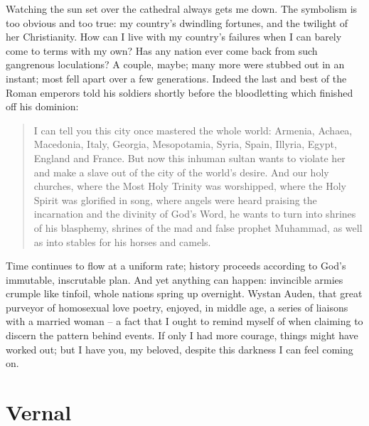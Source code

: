 \documentclass{amsbook}
\begin{document}
Watching the sun set over the cathedral always gets me down. The symbolism is too obvious and too true: my country's dwindling fortunes, and the twilight of her Christianity. How can I live with my country's failures when I can barely come to terms with my own? Has any nation ever come back from such gangrenous loculations? A couple, maybe; many more were stubbed out in an instant; most fell apart over a few generations. Indeed the last and best of the Roman emperors told his soldiers shortly before the bloodletting which finished off his dominion:

\begin{quote}
    I can tell you this city once mastered the whole world: Armenia, Achaea, Macedonia, Italy, Georgia, Mesopotamia, Syria, Spain, Illyria, Egypt, England and France. But now this inhuman sultan wants to violate her and make a slave out of the city of the world's desire. And our holy churches, where the Most Holy Trinity was worshipped, where the Holy Spirit was glorified in song, where angels were heard praising the incarnation and the divinity of God's Word, he wants to turn into shrines of his blasphemy, shrines of the mad and false prophet Muhammad, as well as into stables for his horses and camels.
\end{quote}

Time continues to flow at a uniform rate; history proceeds according to God's immutable, inscrutable plan. And yet anything can happen: invincible armies crumple like tinfoil, whole nations spring up overnight. Wystan Auden, that great purveyor of homosexual love poetry, enjoyed, in middle age, a series of liaisons with a married woman -- a fact that I ought to remind myself of when claiming to discern the pattern behind events. If only I had more courage, things might have worked out; but I have you, my beloved, despite this darkness I can feel coming on.

    \chapter{Vernal}
\end{document}

